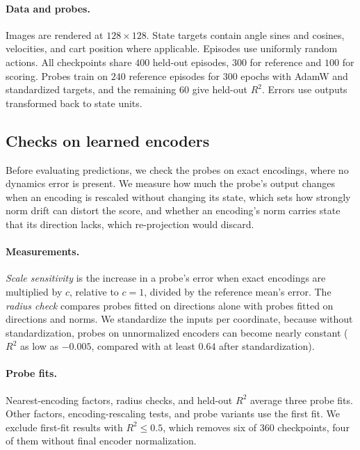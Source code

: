 \paragraph{Data and probes.} Images are rendered at $128\times128$. State targets contain angle sines and cosines, velocities, and cart position where applicable. Episodes use uniformly random actions. All checkpoints share $400$ held-out episodes, $300$ for reference and $100$ for scoring. Probes train on $240$ reference episodes for $300$ epochs with AdamW and standardized targets, and the remaining $60$ give held-out $R^2$. Errors use outputs transformed back to state units.



\subsection{Checks on learned encoders}
\label{app:encoder}
Before evaluating predictions, we check the probes on exact encodings, where no dynamics error is present. We measure how much the probe's output changes when an encoding is rescaled without changing its state, which sets how strongly norm drift can distort the score, and whether an encoding's norm carries state that its direction lacks, which re-projection would discard.

\paragraph{Measurements.} \emph{Scale sensitivity} is the increase in a probe's error when exact encodings are multiplied by $c$, relative to $c=1$, divided by the reference mean's error. The \emph{radius check} compares probes fitted on directions alone with probes fitted on directions and norms. We standardize the inputs per coordinate, because without standardization, probes on unnormalized encoders can become nearly constant ($R^2$ as low as $-0.005$, compared with at least $0.64$ after standardization).

\paragraph{Probe fits.} Nearest-encoding factors, radius checks, and held-out $R^2$ average three probe fits. Other factors, encoding-rescaling tests, and probe variants use the first fit. We exclude first-fit results with $R^2\le0.5$, which removes six of $360$ checkpoints, four of them without final encoder normalization.

